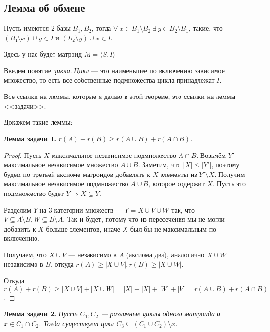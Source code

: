 \subsection{Лемма об обмене}

\begin{Lemma}
  Пусть имеются 2 базы $B_1, B_2$, тогда $\forall \ x \in B_1 \setminus B_2
  \ \exists \ y \in B_2 \setminus B_1$, такие, что $(B_1 \setminus x) \cup y \in I$ и
  $(B_2 \setminus y) \cup x \in I$.
\end{Lemma}

Здесь у нас будет матроид $M = \langle S, I \rangle$

Введем понятие {\it цикла}. {\it Цикл} --- это наименьшее по включению зависимое
множество, то есть все собственные подмножества цикла принадлежат $I$.

Все ссылки на леммы, которые я делаю в этой теореме, это ссылки
на леммы <<задачи>>.

Докажем такие леммы:

{\bf Лемма задачи 1.} {\it $r(A) + r(B) \geqslant r(A \cup B) + r(A \cap B)$.}

\begin{proof}
  Пусть $X$ максимальное независимое подмножество $A \cap B$. Возьмём $Y'$ ---
  максимальное независимое множество $A \cup B$. Заметим, что $|X| \leqslant 
  |Y'|$, поэтому будем по третьей аксиоме матроидов добавлять к $X$ элементы из $Y' 
  \setminus X$. Получим максимальное независимое подмножество $A \cup B$, которое
  содержит $X$. Пусть это подмножество будет $Y \Rightarrow X \subseteq Y$.

  Разделим $Y$ на 3 категории множеств --- $Y = X \cup V \cup W$ так, что
  $V \subseteq A \setminus B, W \subseteq B \setminus A$. Так и будет, потому
  что из пересечения мы не могли добавить к $X$ больше элементов, иначе $X$ был
  бы не максимальным по включению.

  Получаем, что $X \cup V$ --- независимо в $A$ (аксиома два), аналогично $X \cup W$
  независимо в $B$, откуда $r(A) \geqslant |X \cup V|, r(B) \geqslant |X \cup W|$.

  Откуда $r(A) + r(B) \geqslant |X \cup V| + |X \cup W| = |X| + |X| + |W| + |V| =
  r(A \cup B) + r(A \cap B)$.
\end{proof}

{\bf Лемма задачи 2.} {\it Пусть $C_1, C_2$ --- различные циклы одного матроида и $x \in
C_1 \cap C_2$. Тогда существует цикл $C_3 \subseteq (C_1 \cup C_2) \setminus x$.}

